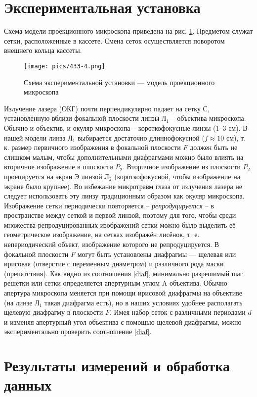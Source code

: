 \documentclass[a4paper,12pt]{article}
\begin{document}
\section{Экспериментальная установка}

Схема модели проекционного микроскопа приведена на рис. \ref{micro}. Предметом служат сетки, расположенные в кассете. Смена сеток осуществляется поворотом внешнего кольца кассеты.

\begin{figure}[!ht]
    \centering
    \texttt{[image: pics/433-4.png]}
    \caption{Схема экспериментальной установки — модель проекционного микроскопа}
    \label{micro}
\end{figure}

Излучение лазера (ОКГ) почти перпендикулярно падает на сетку С, установленную вблизи фокальной плоскости линзы Л$_1$ -- объектива микроскопа. Обычно и объектив, и окуляр микроскопа -- короткофокусные линзы (1–3 см). В нашей модели линза Л$_1$ выбирается достаточно длиннофокусной ($f \approx 10$ см), т. к. размер первичного изображения в фокальной плоскости $F$ должен быть не слишком малым, чтобы дополнительными диафрагмами можно было влиять на вторичное изображение в плоскости $P_2$. Вторичное изображение из плоскости $P_2$ проецируется на экран Э линзой Л$_2$ (короткофокусной, чтобы изображение на экране было крупнее). Во избежание микротравм глаза от излучения лазера не следует использовать эту линзу традиционным образом как окуляр микроскопа.
Изображение сетки периодически повторяется -- \textit{репродуцируется} -- в пространстве между сеткой и первой линзой, поэтому для того, чтобы среди множества репродуцированных изображений сетки можно было выделить её геометрическое изображение, на сетках изображён лисёнок, т. е. непериодический объект, изображение которого не репродуцируется.
В фокальной плоскости $F$ могут быть установлены диафрагмы — щелевая или ирисовая (отверстие с переменным диаметром) и различного рода маски (препятствия).
Как видно из соотношения \eqref{diaf}, минимально разрешимый шаг решётки или сетки определяется апертурным углом A объектива. Обычно апертура микроскопа меняется при помощи ирисовой диафрагмы на объективе (на линзе Л$_1$ такая диафрагма есть), но в наших условиях удобнее располагать щелевую диафрагму в плоскости $F$. Имея набор сеток с различными периодами $d$ и изменяя апертурный угол объектива с помощью щелевой диафрагмы, можно экспериментально проверить соотношение \eqref{diaf}.

\section{Результаты измерений и обработка данных}
\end{document}
